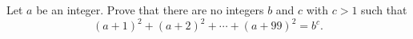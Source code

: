 Let $a$ be an integer. Prove that there are no integers $b$ and $c$ with $c>1$ such that
\[
(a+1)^2+(a+2)^2+\cdots+(a+99)^2=b^c .
\]
